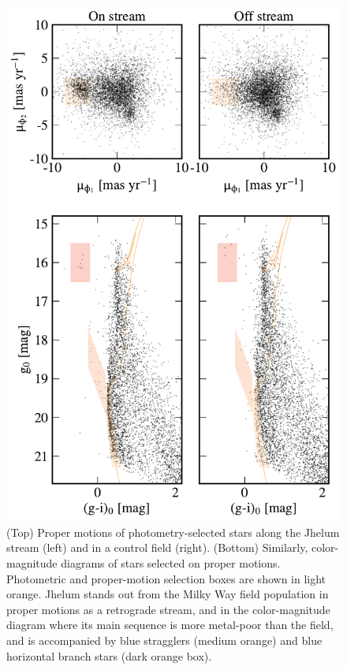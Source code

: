 \documentclass[twocolumn]{aastex62}
\begin{document}
\begin{figure}
\begin{center}
\includegraphics[width=0.95\columnwidth]{selection.pdf}
\end{center}
\caption{
(Top) Proper motions of photometry-selected stars along the Jhelum stream (left) and in a control field (right).
(Bottom) Similarly, color-magnitude diagrams of stars selected on proper motions.
Photometric and proper-motion selection boxes are shown in light orange.
Jhelum stands out from the Milky Way field population in proper motions as a retrograde stream, and in the color-magnitude diagram where its main sequence is more metal-poor than the field, and is accompanied by blue stragglers (medium orange) and blue horizontal branch stars (dark orange box).
}
\label{fig:properties}
\end{figure}
\end{document}
